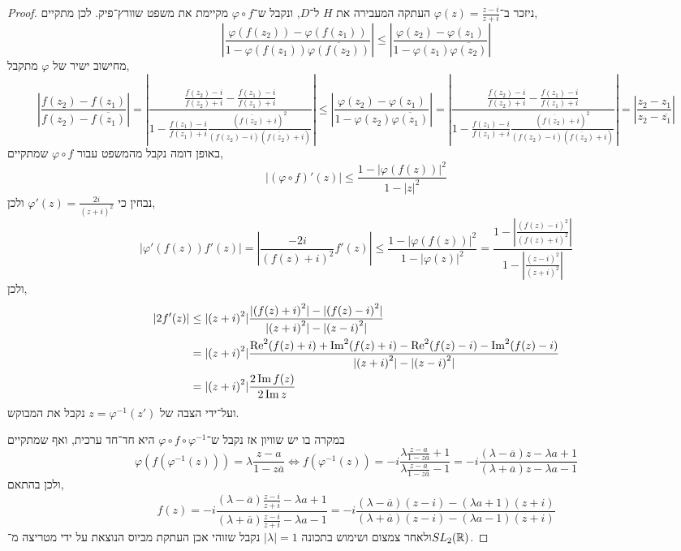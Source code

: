 \begin{proof}
	ניזכר ב־$\varphi(z) = \frac{z - i}{z + i}$ העתקה המעבירה את $H$ ל־$D$, ונקבל ש־$\varphi \circ f$ מקיימת את משפט שוורץ־פיק.
	לכן מתקיים,
	\[
		\left\lvert \frac{\varphi(f(z_2)) - \varphi(f(z_1))}{1 - \varphi(f(z_1)) \overline{\varphi(f(z_2))}} \right\rvert
		\le \left\lvert \frac{\varphi(z_2) - \varphi(z_1)}{1 - \varphi(z_1) \overline{\varphi(z_2)}} \right\rvert
	\]
	מחישוב ישיר של $\varphi$ מתקבל,
	\[
		\left\lvert \frac{f(z_2) - f(z_1)}{f(z_2) - \overline{f(z_1)}} \right\rvert
		= \left\lvert \frac{\frac{f(z_2) - i}{f(z_2) + i} - \frac{f(z_1) - i}{f(z_1) + i}}{1 - \frac{f(z_1) - i}{f(z_1) + i} \frac{{(\overline{f(z_2)} + i)}^2}{(f(z_2) - i)(\overline{f(z_2)} + i)}} \right\rvert
		\le \left\lvert \frac{\varphi(z_2) - \varphi(z_1)}{1 - \varphi(z_2) \overline{\varphi(z_1)}} \right\rvert
		= \left\lvert \frac{\frac{f(z_2) - i}{f(z_2) + i} - \frac{f(z_1) - i}{f(z_1) + i}}{1 - \frac{f(z_1) - i}{f(z_1) + i} \frac{{(\overline{f(z_2)} + i)}^2}{(f(z_2) - i)(\overline{f(z_2)} + i)}} \right\rvert
		= \left\lvert \frac{z_2 - z_1}{z_2 - \overline{z_1}} \right\rvert
	\]
	באופן דומה נקבל מהמשפט עבור $\varphi \circ f$ שמתקיים,
	\[
		|(\varphi \circ f)'(z)| \le \frac{1 - {|\varphi(f(z))|}^2}{1 - {|z|}^2}
	\]
	נבחין כי $\varphi'(z) = \frac{2i}{{(z + i)}^2}$ ולכן,
	\[
		\left\lvert \varphi'(f(z)) f'(z) \right\rvert
		= \left\lvert \frac{-2i}{{(f(z) + i)}^2} f'(z) \right\rvert
		\le \frac{1 - {|\varphi(f(z))|}^2}{1 - {|\varphi(z)|}^2}
		= \frac{1 - \left\lvert \frac{{(f(z) - i)}^2}{{(f(z) + i)}^2} \right\rvert}{1 - \left\lvert \frac{{(z - i)}^2}{{(z + i)}^2} \right\rvert}
	\]
	ולכן,
	\begin{align*}
		\left\lvert 2 f'(z) \right\rvert
		& \le |{(z + i)}^2| \frac{{|(f(z) + i)}^2| - |{(f(z) - i)}^2| }{|{(z + i)}^2| - |{(z - i)}^2| } \\
		& = |{(z + i)}^2| \frac{\operatorname{Re}^2(f(z) + i) + \operatorname{Im}^2(f(z) + i) - \operatorname{Re}^2(f(z) - i) - \operatorname{Im}^2(f(z) - i)}{|{(z + i)}^2| - |{(z - i)}^2| } \\
		& = |{(z + i)}^2| \frac{2 \operatorname{Im} f(z)}{2 \operatorname{Im} z}
	\end{align*}
	ועל־ידי הצבה של $z = \varphi^{-1}(z')$ נקבל את המבוקש.

	במקרה בו יש שוויון אז נקבל ש־$\varphi \circ f \circ \varphi^{-1}$ היא חד־חד ערכית, ואף שמתקיים
	\[
		\varphi(f(\varphi^{-1}(z)))
		= \lambda \frac{z - a}{1 - z \overline{a}}
		\iff f(\varphi^{-1}(z))
		= -i \frac{\lambda \frac{z - a}{1 - z \overline{a}} + 1}{\lambda \frac{z - a}{1 - z \overline{a}} - 1}
		= -i \frac{(\lambda - \overline{a}) z - \lambda a + 1}{(\lambda + \overline{a})z - \lambda a - 1}
	\]
	ולכן בהתאם,
	\[
		f(z)
		= -i \frac{(\lambda - \overline{a}) \frac{z - i}{z + i} - \lambda a + 1}{(\lambda + \overline{a}) \frac{z - i}{z + i} - \lambda a - 1}
		= -i \frac{(\lambda - \overline{a}) (z - i) - (\lambda a + 1)(z + i)}{(\lambda + \overline{a}) (z - i) - (\lambda a - 1)(z + i)}
	\]
	ולאחר צמצום ושימוש בתכונה $|\lambda| = 1$ נקבל שזוהי אכן העתקת מביוס הנוצאת על ידי מטריצה מ־$SL_2(\mathbb{R})$.
\end{proof}

